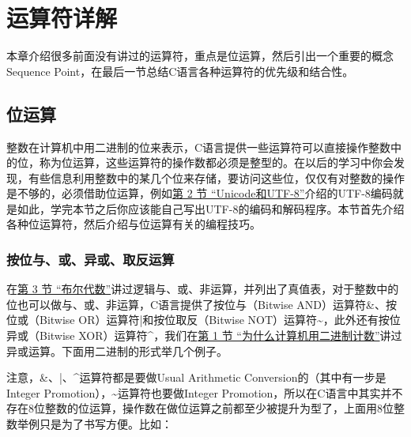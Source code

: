 

\chapter{运算符详解}
%
本章介绍很多前面没有讲过的运算符，重点是位运算，然后引出一个重要的概念Sequence Point，在最后一节总结C语言各种运算符的优先级和结合性。




\section{位运算}
%
整数在计算机中用二进制的位来表示，C语言提供一些运算符可以直接操作整数中的位，称为位运算，这些运算符的操作数都必须是整型的。在以后的学习中你会发现，有些信息利用整数中的某几个位来存储，要访问这些位，仅仅有对整数的操作是不够的，必须借助位运算，例如\hyperlink{db.apas02.id2906489}{第 2 节 “Unicode和UTF-8”}介绍的UTF-8编码就是如此，学完本节之后你应该能自己写出UTF-8的编码和解码程序。本节首先介绍各种位运算符，然后介绍与位运算有关的编程技巧。


\subsection{按位与、或、异或、取反运算}
%


在\hyperlink{db.ch04s03.id2718970}{第 3 节 “布尔代数”}讲过逻辑与、或、非运算，并列出了真值表，对于整数中的位也可以做与、或、非运算，C语言提供了按位与（Bitwise AND）运算符\&、按位或（Bitwise OR）运算符|和按位取反（Bitwise NOT）运算符\textasciitilde{}，此外还有按位异或（Bitwise XOR）运算符\textasciicircum{}，我们在\hyperlink{db.ch14s01.id2752672}{第 1 节 “为什么计算机用二进制计数”}讲过异或运算。下面用二进制的形式举几个例子。




注意，\&、|、\textasciicircum{}运算符都是要做Usual Arithmetic Conversion的（其中有一步是Integer Promotion），\textasciitilde{}运算符也要做Integer Promotion，所以在C语言中其实并不存在8位整数的位运算，操作数在做位运算之前都至少被提升为型了，上面用8位整数举例只是为了书写方便。比如：


